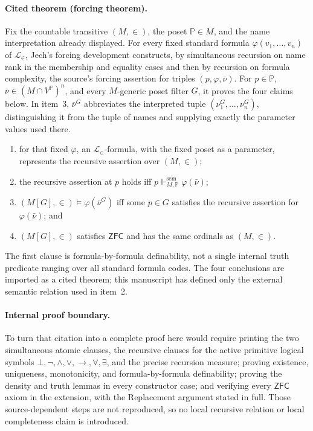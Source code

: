 \documentclass[11pt,oneside,openany]{book}
\theoremstyle{definition}
\theoremstyle{plain}
\theoremstyle{remark}
\newcommand{\Lang}{\mathcal{L}}
\newcommand{\entails}{\models}
\newcommand{\bottom}{\bot}
\newcommand{\forces}{\Vdash}
\newcommand{\ZFC}{\mathsf{ZFC}}
\begin{document}
\paragraph{Cited theorem (forcing theorem).}
Fix the countable transitive \((M,\in)\), the poset \(\mathbb P\in M\), and
the name interpretation already displayed.  For every fixed standard formula
\(\varphi(v_1,\ldots,v_n)\) of \(\Lang_{\in}\), Jech's forcing development
\cite[pp.~201--224]{Jech2003} constructs, by simultaneous recursion on name
rank in the membership and equality cases and then by recursion on formula
complexity, the source's forcing assertion for triples
\((p,\varphi,\bar\nu)\).  For \(p\in\mathbb P\),
\(\bar\nu\in(M\cap V^{\mathbb P})^n\), and every \(M\)-generic poset filter
\(G\), it proves the four claims below.  In item~3,
\(\bar\nu^G\) abbreviates the interpreted tuple
\((\nu_1^G,\ldots,\nu_n^G)\), distinguishing it from the tuple of names and
supplying exactly the parameter values used there.
\begin{enumerate}
  \item for that fixed \(\varphi\), an \(\Lang_{\in}\)-formula, with the fixed
        poset as a parameter, represents the recursive assertion over
        \((M,\in)\);
  \item the recursive assertion at \(p\) holds iff
        \(p\forces^{\mathrm{sem}}_{M,\mathbb P}\varphi(\bar\nu)\);
  \item \((M[G],\in)\entails\varphi(\bar\nu^G)\) iff some
        \(p\in G\) satisfies the recursive assertion for
        \(\varphi(\bar\nu)\); and
  \item \((M[G],\in)\) satisfies \(\ZFC\) and has the same ordinals as
        \((M,\in)\).
\end{enumerate}
The first clause is formula-by-formula definability, not a single internal
truth predicate ranging over all standard formula codes.  The four conclusions
are imported as a cited theorem; this manuscript has defined only the external
semantic relation used in item~2.

\paragraph{Internal proof boundary.}
To turn that citation into a complete proof here would require printing the two
simultaneous atomic clauses, the recursive clauses for the active primitive
logical symbols
\(\bottom,\neg,\land,\lor,\to,\forall,\exists\), and the precise recursion
measure; proving existence, uniqueness, monotonicity, and formula-by-formula
definability; proving the density and truth lemmas in every constructor case;
and verifying every \(\ZFC\) axiom in the extension, with the Replacement
argument stated in full.  Those source-dependent steps are not reproduced, so
no local recursive relation or local completeness claim is introduced.
\end{document}
